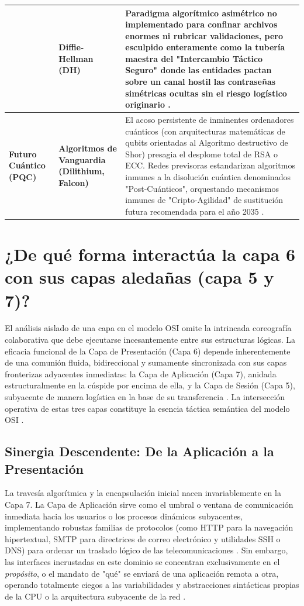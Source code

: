 \documentclass[a4paper,12pt]{article}
\begin{document}
\begin{table}[H]
{\begin{tabular}{@{}p{3cm}p{3cm}p{8.5cm}@{}}
 & \textbf{Diffie-Hellman (DH)} & Paradigma algorítmico asimétrico no implementado para confinar archivos enormes ni rubricar validaciones, pero esculpido enteramente como la tubería maestra del "Intercambio Táctico Seguro" donde las entidades pactan sobre un canal hostil las contraseñas simétricas ocultas sin el riesgo logístico originario \cite{redes_crypto, encrypt_sym}. \\ \midrule
\multirow{1}{*}{\textbf{Futuro Cuántico (PQC)}} & \textbf{Algoritmos de Vanguardia (Dilithium, Falcon)} & El acoso persistente de inminentes ordenadores cuánticos (con arquitecturas matemáticas de qubits orientadas al Algoritmo destructivo de Shor) presagia el desplome total de RSA o ECC. Redes previsoras estandarizan algoritmos inmunes a la disolución cuántica denominados "Post-Cuánticos", orquestando mecanismos inmunes de "Cripto-Agilidad" de sustitución futura recomendada para el año 2035 \cite{keyfactor_sym}. \\ \bottomrule
\end{tabular}%
}
\end{table}

\section{¿De qué forma interactúa la capa 6 con sus capas aledañas (capa 5 y 7)?}

El análisis aislado de una capa en el modelo OSI omite la intrincada coreografía colaborativa que debe ejecutarse incesantemente entre sus estructuras lógicas. La eficacia funcional de la Capa de Presentación (Capa 6) depende inherentemente de una comunión fluida, bidireccional y sumamente sincronizada con sus capas fronterizas adyacentes inmediatas: la Capa de Aplicación (Capa 7), anidada estructuralmente en la cúspide por encima de ella, y la Capa de Sesión (Capa 5), subyacente de manera logística en la base de su transferencia \cite{ibm_osi_layer6, fortinet_osi}. La intersección operativa de estas tres capas constituye la esencia táctica semántica del modelo OSI \cite{aws_osi}.

\subsection*{Sinergia Descendente: De la Aplicación a la Presentación}

La travesía algorítmica y la encapsulación inicial nacen invariablemente en la Capa 7. La Capa de Aplicación sirve como el umbral o ventana de comunicación inmediata hacia los usuarios o los procesos dinámicos subyacentes, implementando robustas familias de protocolos (como HTTP para la navegación hipertextual, SMTP para directrices de correo electrónico y utilidades SSH o DNS) para ordenar un traslado lógico de las telecomunicaciones \cite{ibm_osi_layer6, paloalto_l7}. Sin embargo, las interfaces incrustadas en este dominio se concentran exclusivamente en el \textit{propósito}, o el mandato de "qué" se enviará de una aplicación remota a otra, operando totalmente ciegos a las variabilidades y abstracciones sintácticas propias de la CPU o la arquitectura subyacente de la red \cite{ibm_osi_layer6}.
\end{document}

